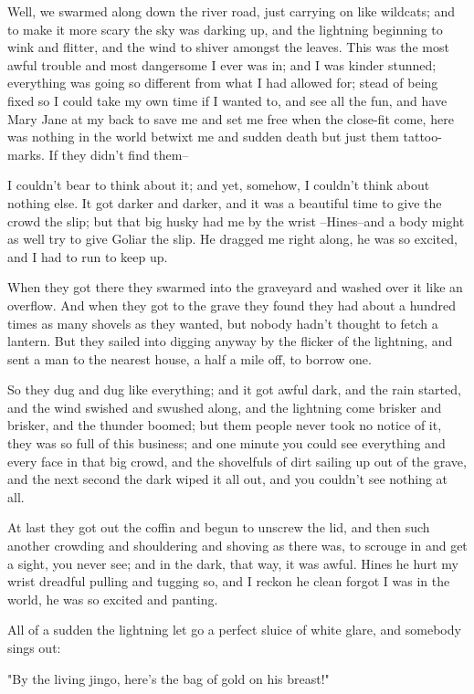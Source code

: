 Well, we swarmed along down the river road, just carrying on like
wildcats; and to make it more scary the sky was darking up, and the
lightning beginning to wink and flitter, and the wind to shiver amongst
the leaves. This was the most awful trouble and most dangersome I ever
was in; and I was kinder stunned; everything was going so different from
what I had allowed for; stead of being fixed so I could take my own time
if I wanted to, and see all the fun, and have Mary Jane at my back to
save me and set me free when the close-fit come, here was nothing in the
world betwixt me and sudden death but just them tattoo-marks.  If they
didn't find them--

I couldn't bear to think about it; and yet, somehow, I couldn't think
about nothing else.  It got darker and darker, and it was a beautiful
time to give the crowd the slip; but that big husky had me by the wrist
--Hines--and a body might as well try to give Goliar the slip.  He dragged
me right along, he was so excited, and I had to run to keep up.

When they got there they swarmed into the graveyard and washed over it
like an overflow.  And when they got to the grave they found they had
about a hundred times as many shovels as they wanted, but nobody hadn't
thought to fetch a lantern.  But they sailed into digging anyway by the
flicker of the lightning, and sent a man to the nearest house, a half a
mile off, to borrow one.

So they dug and dug like everything; and it got awful dark, and the rain
started, and the wind swished and swushed along, and the lightning come
brisker and brisker, and the thunder boomed; but them people never took
no notice of it, they was so full of this business; and one minute you
could see everything and every face in that big crowd, and the shovelfuls
of dirt sailing up out of the grave, and the next second the dark wiped
it all out, and you couldn't see nothing at all.

At last they got out the coffin and begun to unscrew the lid, and then
such another crowding and shouldering and shoving as there was, to
scrouge in and get a sight, you never see; and in the dark, that way, it
was awful.  Hines he hurt my wrist dreadful pulling and tugging so, and I
reckon he clean forgot I was in the world, he was so excited and panting.

All of a sudden the lightning let go a perfect sluice of white glare, and
somebody sings out:

"By the living jingo, here's the bag of gold on his breast!"

